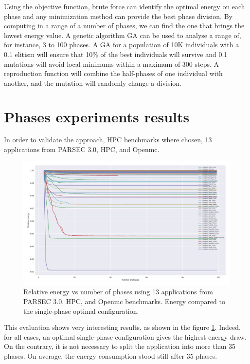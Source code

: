 Using the objective function, brute force can identify the optimal energy on each phase and any minimization method can provide the best phase division. By computing in a range of a number of phases, we can find the one that brings the lowest energy value. A genetic algorithm GA can be used to analyse a range of, for instance, 3 to 100 phases. A GA for a population of 10K individuals with a 0.1 elitism will ensure that 10\% of the best individuals will survive and 0.1 mutations will avoid local minimums within a maximum of 300 steps. A reproduction function will combine the half-phases of one individual with another, and the mutation will randomly change a division.

\section{Phases experiments results} \label{sec:results_phases_experiments}


In order to validate the approach, HPC benchmarks where chosen, 13 applications from PARSEC 3.0, HPC, and Openmc.

\begin{figure}[H]
\includegraphics[width=\columnwidth]{fingerprint/figures/energy_per_phase.png}
    \caption{Relative energy vs number of phases using 13 applications from PARSEC 3.0, HPC, and Openmc benchmarks. Energy compared to the single-phase optimal configuration.}
    \label{fig:relative_energy}
\end{figure}

This evaluation shows very interesting results, as shown in the figure \ref{fig:relative_energy}. Indeed, for all cases, an optimal single-phase configuration gives the highest energy draw. On the contrary, it is not necessary to split the application into more than 35 phases. On average, the energy consumption stood still after 35 phases. 


